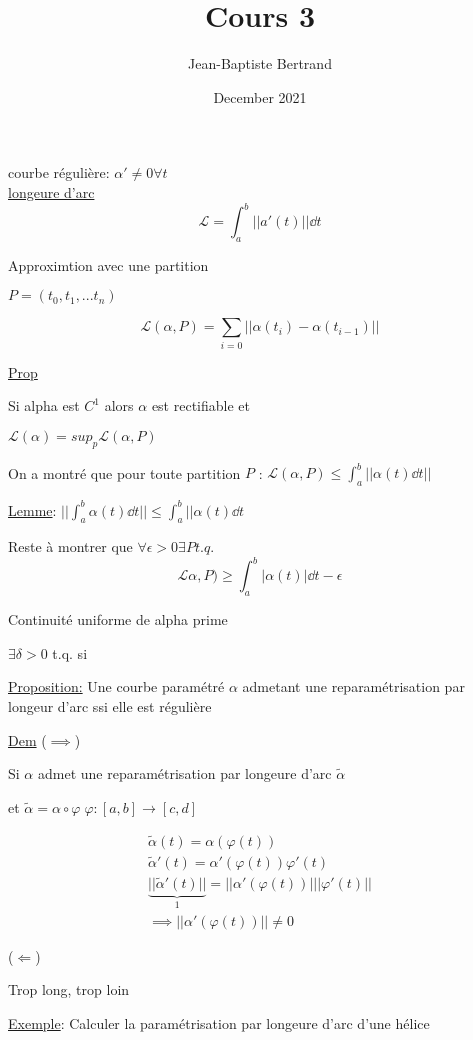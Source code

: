 \documentclass{article}
\title{Cours 3}
\author{Jean-Baptiste Bertrand}
\date{December 2021}
\begin{document}
\maketitle

courbe régulière: $\alpha' \neq 0 \forall t$\\


\underline{longeure d'arc}
$$\mathscr{L} = \int_a^b ||a'(t)|| \dd t$$

Approximtion avec une partition

$P = (t_0, t_1, ... t_n)$

$$\mathscr{L}(\alpha,P) = \sum_{i=0}||\alpha(t_i)-\alpha(t_{i-1})||$$


\underline{Prop}

Si alpha est $C^1$ alors $\alpha$ est rectifiable et 

$\mathscr{L}(\alpha) = sup_p \mathscr{L}(\alpha,P)$


On a montré que pour toute partition $P$ : $\mathscr{L}(\alpha, P) \leq \int_a^b||\alpha(t)\dd t||$

\underline{Lemme}: $||\int_a^b\alpha(t)\dd t|| \leq \int_a^b ||\alpha(t)\dd t$

Reste à montrer que $\forall \epsilon > 0 \exists P t.q.$
$$\mathscr{L}\alpha,P) \geq \int_a^b |\alpha(t)|\dd t -\epsilon$$

Continuité uniforme de alpha prime 

$\exists \delta > 0$ t.q. si 

\underline{Proposition:} Une courbe paramétré $\alpha$ admetant une reparamétrisation par longeur d'arc ssi elle est régulière


\underline{Dem} ($\implies$)

Si $\alpha$ admet une reparamétrisation par longeure d'arc $\tilde \alpha$

et $\tilde \alpha = \alpha \circ \varphi\; \varphi:[a,b] \to [c,d]$

\begin{align*}
	\tilde \alpha(t) =\alpha (\varphi(t))\\
	\tilde \alpha'(t) =\alpha'(\varphi(t))\varphi'(t)\\
	\underbrace{||\tilde \alpha'(t)||}_1 =||\alpha'(\varphi(t))|| |\varphi'(t)||\\
	\implies ||\alpha'(\varphi(t))|| \neq 0
\end{align*}

($\Longleftarrow$)

Trop long, trop loin

\underline{Exemple}: Calculer la paramétrisation par longeure d'arc d'une hélice 
\end{document}
